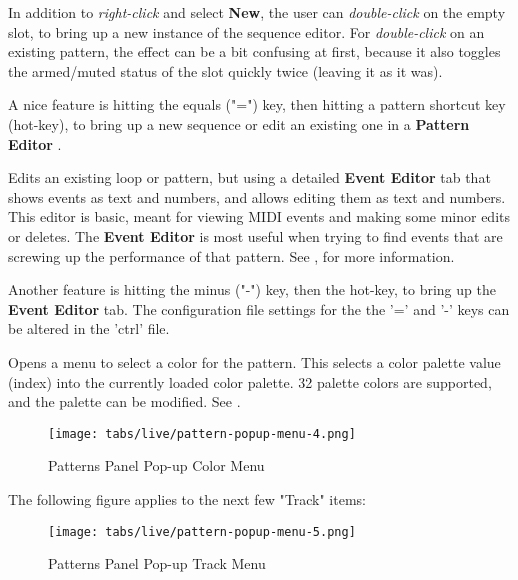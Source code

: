    In addition to \textsl{right-click} and select \textbf{New}, the user can
   \textsl{double-click} on the empty slot,
   to bring up a new instance of the sequence
   editor.  For \textsl{double-click} on an existing pattern,
   the effect can be a bit confusing at first,
   because it also toggles the armed/muted status of the slot
   quickly twice (leaving it as it was).


   A nice feature is hitting the equals ("=") key, then hitting
   a pattern shortcut key (hot-key), to bring up a new sequence or edit an
   existing one in a \textbf{Pattern Editor} .

   Edits an existing loop or pattern, but using a detailed \textbf{Event Editor}
   tab that shows events as text and numbers, and allows editing them as text
   and numbers.
   This editor is basic, meant for viewing
   MIDI events and making some minor edits or deletes.
   The \textbf{Event Editor} is most useful when trying to find events
   that are screwing up the performance of that pattern.
   See , for more information.

   Another feature is hitting the minus
   ("-") key, then the hot-key, to bring up the \textbf{Event Editor} tab.
   The configuration file settings for the the '=' and
   '-' keys can be altered in the 'ctrl' file.

   Opens a menu to select a color for the pattern.  This selects a color
   palette value (index) into the currently loaded color palette.
   32 palette colors are supported, and the palette can be modified.
   See .

\begin{figure}[H]
   \centering 
   \texttt{[image: tabs/live/pattern-popup-menu-4.png]}
   \caption{Patterns Panel Pop-up Color Menu}
   \label{fig:patterns_panel_popup_color_menu}
\end{figure}

   The following figure applies to the next few "Track" items:

\begin{figure}[H]
   \centering 
   \texttt{[image: tabs/live/pattern-popup-menu-5.png]}
   \caption{Patterns Panel Pop-up Track Menu}
   \label{fig:patterns_panel_popup_track_menu}
\end{figure}

